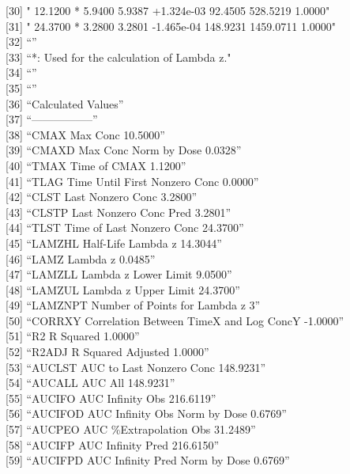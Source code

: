 \documentclass[]{krantz}
\renewenvironment{quote}{\begin{VF}}{\end{VF}}
\theoremstyle{definition}
\theoremstyle{definition}
\theoremstyle{definition}
\theoremstyle{remark}
\begin{document}
\begin{quote}
{[}30{]} " 12.1200 * 5.9400 5.9387 +1.324e-03 92.4505 528.5219 1.0000"\\
{[}31{]} " 24.3700 * 3.2800 3.2801 -1.465e-04 148.9231 1459.0711
1.0000"\\
{[}32{]} ``''\\
{[}33{]} ``*: Used for the calculation of Lambda z."\\
{[}34{]} ``''\\
{[}35{]} ``''\\
{[}36{]} ``Calculated Values''\\
{[}37{]} ``-----------------''\\
{[}38{]} ``CMAX Max Conc 10.5000''\\
{[}39{]} ``CMAXD Max Conc Norm by Dose 0.0328''\\
{[}40{]} ``TMAX Time of CMAX 1.1200''\\
{[}41{]} ``TLAG Time Until First Nonzero Conc 0.0000''\\
{[}42{]} ``CLST Last Nonzero Conc 3.2800''\\
{[}43{]} ``CLSTP Last Nonzero Conc Pred 3.2801''\\
{[}44{]} ``TLST Time of Last Nonzero Conc 24.3700''\\
{[}45{]} ``LAMZHL Half-Life Lambda z 14.3044''\\
{[}46{]} ``LAMZ Lambda z 0.0485''\\
{[}47{]} ``LAMZLL Lambda z Lower Limit 9.0500''\\
{[}48{]} ``LAMZUL Lambda z Upper Limit 24.3700''\\
{[}49{]} ``LAMZNPT Number of Points for Lambda z 3''\\
{[}50{]} ``CORRXY Correlation Between TimeX and Log ConcY -1.0000''\\
{[}51{]} ``R2 R Squared 1.0000''\\
{[}52{]} ``R2ADJ R Squared Adjusted 1.0000''\\
{[}53{]} ``AUCLST AUC to Last Nonzero Conc 148.9231''\\
{[}54{]} ``AUCALL AUC All 148.9231''\\
{[}55{]} ``AUCIFO AUC Infinity Obs 216.6119''\\
{[}56{]} ``AUCIFOD AUC Infinity Obs Norm by Dose 0.6769''\\
{[}57{]} ``AUCPEO AUC \%Extrapolation Obs 31.2489''\\
{[}58{]} ``AUCIFP AUC Infinity Pred 216.6150''\\
{[}59{]} ``AUCIFPD AUC Infinity Pred Norm by Dose 0.6769''\\

\end{quote}
\end{document}
